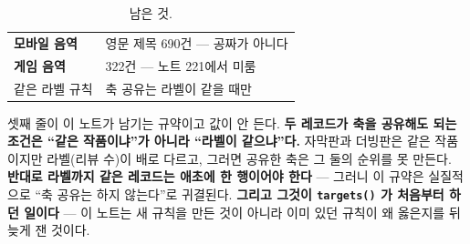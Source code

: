 \documentclass[10pt]{article}
\begin{document}
\begin{table}[t]
\centering\tsize
\caption{남은 것.}
\begin{tabular}{ll}
\toprule
\textbf{모바일 음역} & 영문 제목 690건 --- 공짜가 아니다 \\
\textbf{게임 음역} & 322건 --- 노트 221에서 미룸 \\
같은 라벨 규칙 & 축 공유는 라벨이 같을 때만 \\
\bottomrule
\end{tabular}
\end{table}

셋째 줄이 이 노트가 남기는 규약이고 값이 안 든다. \textbf{두 레코드가
축을 공유해도 되는 조건은 ``같은 작품이냐''가 아니라 ``라벨이 같으냐''다.}
자막판과 더빙판은 같은 작품이지만 라벨(리뷰 수)이 배로 다르고, 그러면
공유한 축은 그 둘의 순위를 못 만든다. \textbf{반대로 라벨까지 같은
레코드는 애초에 한 행이어야 한다} --- 그러니 이 규약은 실질적으로 ``축
공유는 하지 않는다''로 귀결된다. \textbf{그리고 그것이 \texttt{targets()}
가 처음부터 하던 일이다} --- 이 노트는 새 규칙을 만든 것이 아니라 이미
있던 규칙이 왜 옳은지를 뒤늦게 잰 것이다.
\end{document}
